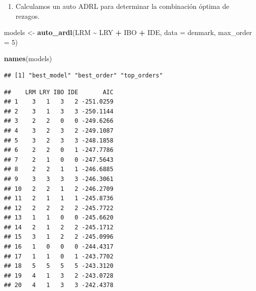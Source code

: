 \documentclass[
]{book}
\newenvironment{Shaded}{\begin{snugshade}}{\end{snugshade}}
\newcommand{\AttributeTok}[1]{\textcolor[rgb]{0.13,0.29,0.53}{#1}}
\newcommand{\CommentTok}[1]{\textcolor[rgb]{0.56,0.35,0.01}{\textit{#1}}}
\newcommand{\DecValTok}[1]{\textcolor[rgb]{0.00,0.00,0.81}{#1}}
\newcommand{\FunctionTok}[1]{\textcolor[rgb]{0.13,0.29,0.53}{\textbf{#1}}}
\newcommand{\NormalTok}[1]{#1}
\newcommand{\OtherTok}[1]{\textcolor[rgb]{0.56,0.35,0.01}{#1}}
\newcommand{\SpecialCharTok}[1]{\textcolor[rgb]{0.81,0.36,0.00}{\textbf{#1}}}
\providecommand{\tightlist}{%
  \setlength{\itemsep}{0pt}\setlength{\parskip}{0pt}}
\begin{document}
\begin{enumerate}
\def\labelenumi{\arabic{enumi}.}
\tightlist
\item
  Calculamos un auto ADRL para determinar la combinación óptima de rezagos.
\end{enumerate}

\begin{Shaded}
\begin{Highlighting}[]
\NormalTok{models }\OtherTok{\textless{}{-}} \FunctionTok{auto\_ardl}\NormalTok{(LRM }\SpecialCharTok{\textasciitilde{}}\NormalTok{ LRY }\SpecialCharTok{+}\NormalTok{ IBO }\SpecialCharTok{+}\NormalTok{ IDE, }\AttributeTok{data =}\NormalTok{ denmark, }\AttributeTok{max\_order =} \DecValTok{5}\NormalTok{)}

\FunctionTok{names}\NormalTok{(models)}
\end{Highlighting}
\end{Shaded}

\begin{verbatim}
## [1] "best_model" "best_order" "top_orders"
\end{verbatim}

\begin{Shaded}
\end{Shaded}

\begin{verbatim}
##    LRM LRY IBO IDE       AIC
## 1    3   1   3   2 -251.0259
## 2    3   1   3   3 -250.1144
## 3    2   2   0   0 -249.6266
## 4    3   2   3   2 -249.1087
## 5    3   2   3   3 -248.1858
## 6    2   2   0   1 -247.7786
## 7    2   1   0   0 -247.5643
## 8    2   2   1   1 -246.6885
## 9    3   3   3   3 -246.3061
## 10   2   2   1   2 -246.2709
## 11   2   1   1   1 -245.8736
## 12   2   2   2   2 -245.7722
## 13   1   1   0   0 -245.6620
## 14   2   1   2   2 -245.1712
## 15   3   1   2   2 -245.0996
## 16   1   0   0   0 -244.4317
## 17   1   1   0   1 -243.7702
## 18   5   5   5   5 -243.3120
## 19   4   1   3   2 -243.0728
## 20   4   1   3   3 -242.4378
\end{verbatim}

\begin{Shaded}
\end{Shaded}
\end{document}
